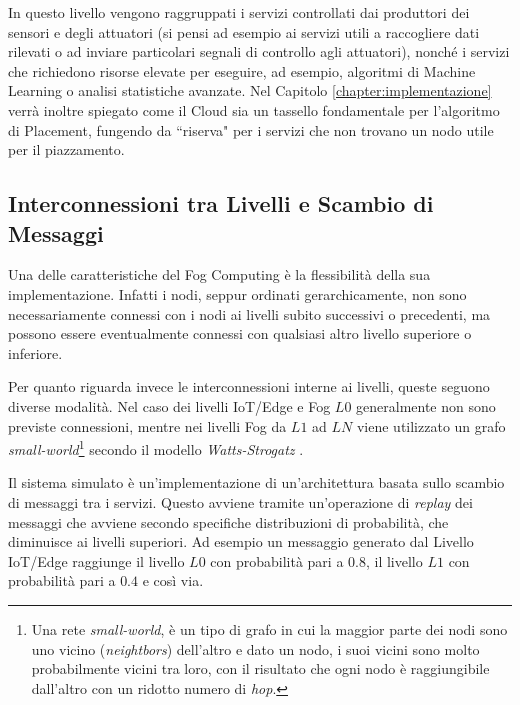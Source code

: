 In questo livello vengono raggruppati i servizi controllati dai produttori dei sensori e degli attuatori (si pensi ad esempio ai servizi utili a raccogliere dati rilevati o ad inviare particolari segnali di controllo agli attuatori), nonché i servizi che richiedono risorse elevate per eseguire, ad esempio, algoritmi di Machine Learning o analisi statistiche avanzate. Nel Capitolo \ref{chapter:implementazione} verrà inoltre spiegato come il Cloud sia un tassello fondamentale per l'algoritmo di Placement, fungendo da ``riserva" per i servizi che non trovano un nodo utile per il piazzamento.

\subsection{Interconnessioni tra Livelli e Scambio di Messaggi}
\label{section:interconnesione_livelli}
Una delle caratteristiche del Fog Computing è la flessibilità della sua implementazione. Infatti i nodi, seppur ordinati gerarchicamente, non sono necessariamente connessi con i nodi ai livelli subito successivi o precedenti, ma possono essere eventualmente connessi con qualsiasi altro livello superiore o inferiore. 

Per quanto riguarda invece le interconnessioni interne ai livelli, queste seguono diverse modalità. Nel caso dei livelli IoT/Edge e Fog $L0$ generalmente non sono previste connessioni, mentre nei livelli Fog da $L1$ ad $LN$ viene utilizzato un grafo \textit{small-world}\footnote{Una rete \textit{small-world}, è un tipo di grafo in cui la maggior parte dei nodi sono uno vicino (\textit{neightbors}) dell'altro e dato un nodo, i suoi vicini sono molto probabilmente vicini tra loro, con il risultato che ogni nodo è raggiungibile dall'altro con un ridotto numero di \textit{hop}.} secondo il modello \textit{Watts-Strogatz} \cite{WattsStrogatzModel}.

Il sistema simulato è un'implementazione di un'architettura basata sullo scambio di messaggi tra i servizi. Questo avviene tramite un'operazione di \textit{replay} dei messaggi che avviene secondo specifiche distribuzioni di probabilità, che diminuisce ai livelli superiori. Ad esempio un messaggio generato dal Livello IoT/Edge raggiunge il livello $L0$ con probabilità pari a $0.8$, il livello $L1$ con probabilità pari a $0.4$ e così via.



















